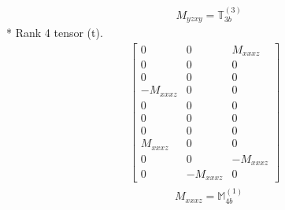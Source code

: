 \documentclass[fleqn,8pt,landscape]{jsarticle}
\begin{document}
\begin{align*}
& M_{yzxy} = \mathbb{T}_{3b}^{(3)}
\end{align*}
* Rank 4 tensor (t).
\begin{align*}
\begin{bmatrix} 0 & 0 & M_{xxxz} \\ 0 & 0 & 0 \\ 0 & 0 & 0 \\ - M_{xxxz} & 0 & 0 \\ 0 & 0 & 0 \\ 0 & 0 & 0 \\ 0 & 0 & 0 \\ M_{xxxz} & 0 & 0 \\ 0 & 0 & - M_{xxxz} \\ 0 & - M_{xxxz} & 0 \end{bmatrix}
\end{align*}
\begin{align*}
& M_{xxxz} = \mathbb{M}_{4b}^{(1)}
\end{align*}
\end{document}

